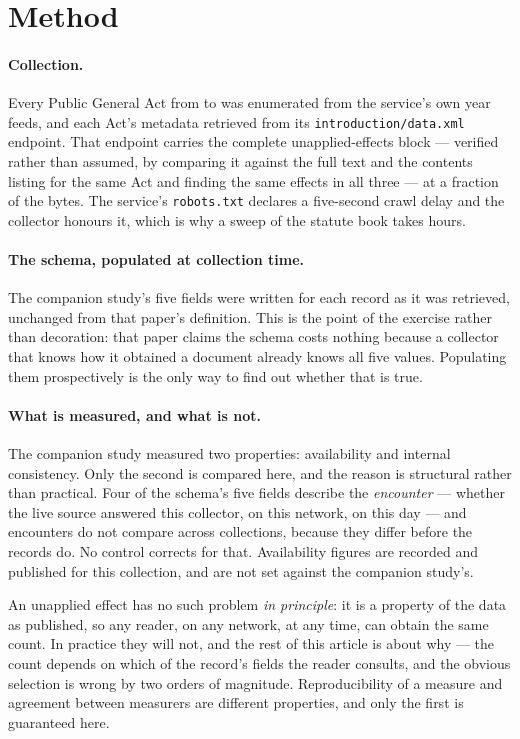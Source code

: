 \documentclass[11pt]{article}
\begin{document}
\section{Method}

\paragraph{Collection.} Every Public General Act from \nYearFrom{} to
\nYearTo{} was enumerated from the service's own year feeds, and each Act's
metadata retrieved from its \texttt{introduction/data.xml} endpoint. That
endpoint carries the complete unapplied-effects block --- verified rather than
assumed, by comparing it against the full text and the contents listing for the
same Act and finding the same effects in all three --- at a fraction of the
bytes. The service's
\texttt{robots.txt} declares a five-second crawl delay and the collector
honours it, which is why a sweep of the statute book takes hours.

\paragraph{The schema, populated at collection time.} The companion study's
five fields were written for each record as it was retrieved, unchanged from
that paper's definition. This is the point of the exercise rather than
decoration: that paper claims the schema costs nothing because a collector that
knows how it obtained a document already knows all five values. Populating them
prospectively is the only way to find out whether that is true.

\paragraph{What is measured, and what is not.} The companion study measured two
properties: availability and internal consistency. Only the second is compared
here, and the reason is structural rather than practical. Four of the schema's
five fields describe the \emph{encounter} --- whether the live source answered
this collector, on this network, on this day --- and encounters do not compare
across collections, because they differ before the records do. No control
corrects for that. Availability figures are recorded and published for this
collection, and are not set against the companion study's.

An unapplied effect has no such problem \emph{in principle}: it is a property
of the data as published, so any reader, on any network, at any time, can
obtain the same count. In practice they will not, and the rest of this article
is about why --- the count depends on which of the record's fields the reader
consults, and the obvious selection is wrong by two orders of magnitude.
Reproducibility of a measure and agreement between measurers are different
properties, and only the first is guaranteed here.
\end{document}
